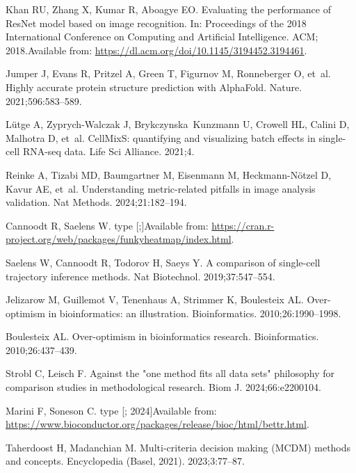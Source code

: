 \documentclass[11pt]{article}
\begin{document}
\begin{thebibliography}{10}
Khan RU, Zhang X, Kumar R, Aboagye EO.
\newblock Evaluating the performance of {ResNet} model based on image
  recognition.
\newblock In: Proceedings of the 2018 International Conference on Computing and
  Artificial Intelligence. ACM; 2018.Available from:
  \url{https://dl.acm.org/doi/10.1145/3194452.3194461}.

Jumper J, Evans R, Pritzel A, Green T, Figurnov M, Ronneberger O, et~al.
\newblock Highly accurate protein structure prediction with AlphaFold.
\newblock Nature. 2021;596:583--589.

Lütge A, Zyprych-Walczak J, Brykczynska~Kunzmann U, Crowell HL, Calini D,
  Malhotra D, et~al.
\newblock CellMixS: quantifying and visualizing batch effects in single-cell
  RNA-seq data.
\newblock Life Sci Alliance. 2021;4.

Reinke A, Tizabi MD, Baumgartner M, Eisenmann M, Heckmann-Nötzel D, Kavur AE,
  et~al.
\newblock Understanding metric-related pitfalls in image analysis validation.
\newblock Nat Methods. 2024;21:182--194.

Cannoodt R, Saelens W. type [;]Available from:
  \url{https://cran.r-project.org/web/packages/funkyheatmap/index.html}.

Saelens W, Cannoodt R, Todorov H, Saeys Y.
\newblock A comparison of single-cell trajectory inference methods.
\newblock Nat Biotechnol. 2019;37:547--554.

Jelizarow M, Guillemot V, Tenenhaus A, Strimmer K, Boulesteix AL.
\newblock Over-optimism in bioinformatics: an illustration.
\newblock Bioinformatics. 2010;26:1990--1998.

Boulesteix AL.
\newblock Over-optimism in bioinformatics research.
\newblock Bioinformatics. 2010;26:437--439.

Strobl C, Leisch F.
\newblock Against the "one method fits all data sets" philosophy for comparison
  studies in methodological research.
\newblock Biom J. 2024;66:e2200104.

Marini F, Soneson C. type [; 2024]Available from:
  \url{https://www.bioconductor.org/packages/release/bioc/html/bettr.html}.

Taherdoost H, Madanchian M.
\newblock Multi-criteria decision making ({MCDM}) methods and concepts.
\newblock Encyclopedia (Basel, 2021). 2023;3:77--87.


\end{thebibliography}
\end{document}
